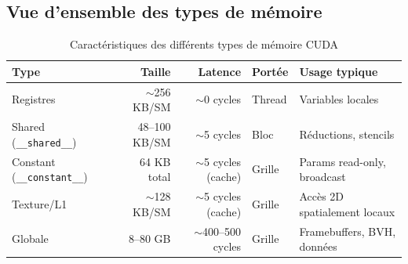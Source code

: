 \documentclass[12pt,a4paper]{article}
\begin{document}
\subsection{Vue d'ensemble des types de mémoire}

\begin{table}[H]
\centering
\begin{tabular}{lrrlp{4.5cm}}
\toprule
\textbf{Type}      & \textbf{Taille}   & \textbf{Latence}    & \textbf{Portée}    & \textbf{Usage typique} \\
\midrule
Registres          & $\sim$256 KB/SM   & $\sim$0 cycles      & Thread             & Variables locales \\
Shared (\texttt{\_\_shared\_\_}) & 48--100 KB/SM & $\sim$5 cycles & Bloc & Réductions, stencils \\
Constant (\texttt{\_\_constant\_\_}) & 64 KB total & $\sim$5 cycles (cache) & Grille & Params read-only, broadcast \\
Texture/L1         & $\sim$128 KB/SM   & $\sim$5 cycles (cache) & Grille          & Accès 2D spatialement locaux \\
Globale            & 8--80 GB          & $\sim$400--500 cycles & Grille           & Framebuffers, BVH, données \\
\bottomrule
\end{tabular}
\caption{Caractéristiques des différents types de mémoire CUDA}
\end{table}
\end{document}
